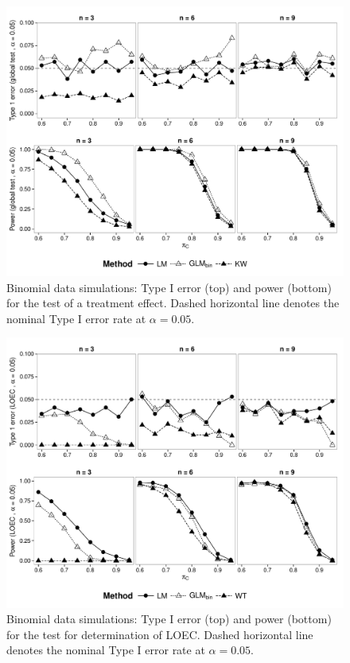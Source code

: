 \begin{landscape}
\begin{figure}
  \centering
  \includegraphics[width = 1.05\textwidth]{chapters/usetheglm/p_glob_p.pdf}
  \caption[Binomial data simulations: 
  Type I error and  power for the test of a treatment effect.]{
  Binomial data simulations: Type I error (top) and  power (bottom) for the test of a treatment effect. 
  Dashed horizontal line denotes the nominal Type I error rate at $\alpha = 0.05$.
  }
  \label{fig:usetheglm:p_glob_p}
\end{figure}
\end{landscape}

\begin{landscape}
\begin{figure}
  \centering
  \includegraphics[width = 1.05\textwidth]{chapters/usetheglm/p_loec_p.pdf}
  \caption[Binomial data simulations: 
  Type I error and power for the test for determination of LOEC.]{
  Binomial data simulations: 
  Type I error (top) and power (bottom) for the test for determination of LOEC. 
  Dashed horizontal line denotes the nominal Type I error rate at $\alpha = 0.05$.
  }
  \label{fig:usetheglm:p_loec_p}
\end{figure}
\end{landscape}



